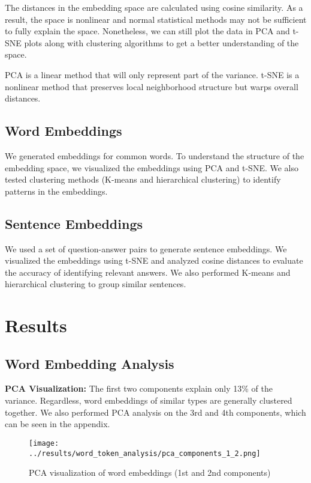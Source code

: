 \documentclass{scrartcl}
\begin{document}
The distances in the embedding space are calculated using cosine similarity. As a result, the space is nonlinear and normal statistical methods may not be sufficient to fully explain the space. Nonetheless, we can still plot the data in PCA and t-SNE plots along with clustering algorithms to get a better understanding of the space.

PCA is a linear method that will only represent part of the variance. t-SNE is a nonlinear method that preserves local neighborhood structure but warps overall distances.

\subsection{Word Embeddings}
We generated embeddings for common words. To understand the structure of the embedding space, we visualized the embeddings using PCA and t-SNE. We also tested clustering methods (K-means and hierarchical clustering) to identify patterns in the embeddings. 

\subsection{Sentence Embeddings}
We used a set of question-answer pairs to generate sentence embeddings. We visualized the embeddings using t-SNE and analyzed cosine distances to evaluate the accuracy of identifying relevant answers. We also performed K-means and hierarchical clustering to group similar sentences.

\section{Results}
\subsection{Word Embedding Analysis}
\textbf{PCA Visualization:} The first two components explain only 13\% of the variance. Regardless, word embeddings of similar types are generally clustered together. We also performed PCA analysis on the 3rd and 4th components, which can be seen in the appendix.

\begin{figure}[H]
    \centering
    \texttt{[image: ../results/word\_token\_analysis/pca\_components\_1\_2.png]}
    \caption{PCA visualization of word embeddings (1st and 2nd components)}
\end{figure}
\end{document}
